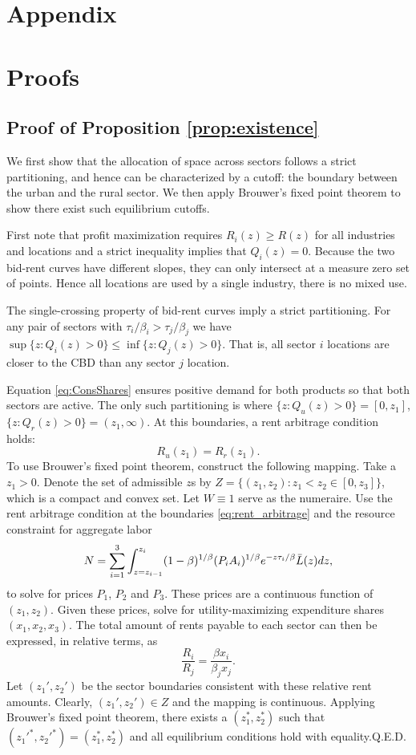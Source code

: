 \documentclass[12pt]{article}
\begin{document}
\clearpage

\appendix
\section*{Appendix}
\section{Proofs}
\subsection{Proof of Proposition \ref{prop:existence}}
We first show that the allocation of space across sectors follows a strict partitioning, and hence can be characterized by a cutoff: the boundary between the urban and the rural sector. We then apply Brouwer's fixed point theorem to show there exist such equilibrium cutoffs.

First note that profit maximization requires $R_i(z)\ge R(z)$ for all industries and locations and a strict inequality implies that $Q_i(z)=0$. Because the two bid-rent curves have different slopes, they can only intersect at a measure zero set of points. Hence all locations are used by a single industry, there is no mixed use.

The single-crossing property of bid-rent curves imply a strict partitioning. For any pair of sectors with $\tau_i/\beta_i>\tau_j/\beta_j$ we have $\sup\{z: Q_i(z)>0\} \le \inf\{z: Q_j(z)>0\}$. That is, all sector $i$ locations are closer to the CBD than any sector $j$ location.

Equation \eqref{eq:ConsShares} ensures positive demand for both products so that both sectors are active. The only such partitioning is where $\{z: Q_u(z)>0\} = [0,z_1]$, $\{z: Q_r(z)>0\} = (z_1,\infty)$. At this boundaries, a rent arbitrage condition holds:
\begin{equation}\label{eq:rent_arbitrage}
	R_u(z_1) = R_{r}(z_1).
\end{equation}
To use Brouwer's fixed point theorem, construct the following mapping. Take a $z_1>0$. Denote the set of admissible $z$s by $Z=\{(z_1,z_2): z_1<z_2 \in [0,z_3]\}$, which is a compact and convex set. 
Let $W\equiv 1$ serve as the numeraire. Use the rent arbitrage condition at the boundaries \eqref{eq:rent_arbitrage} and the resource constraint for aggregate labor
\[
N = \sum_{i=1}^3 \int_{z=z_{i-1}}^{z_i}(1-\beta)^{1/\beta}
	(P_iA_i)^{1/\beta}
	e^{- z \tau_i/\beta}\Bar L(z)dz,
\]
to solve for prices $P_1$, $P_2$ and $P_3$. These prices are a continuous function of $(z_1,z_2)$.
Given these prices, solve for utility-maximizing expenditure shares $(x_1,x_2,x_3)$. The total amount of rents payable to each sector can then be expressed, in relative terms, as
\[
\frac {R_i}
	{R_j}
=
\frac {\beta x_i}
	{\beta_j x_j}.
\]
Let $(z_1',z_2')$ be the sector boundaries consistent with these relative rent amounts. Clearly, $(z_1',z_2')\in Z$ and the mapping is continuous. Applying Brouwer's fixed point theorem, there exists a $(z_1^*,z_2^*)$ such that $(z_1'^{*},z_2'^{*}) = (z_1^*,z_2^*)$ and all equilibrium conditions hold with equality.\hfill Q.E.D.
\end{document}
